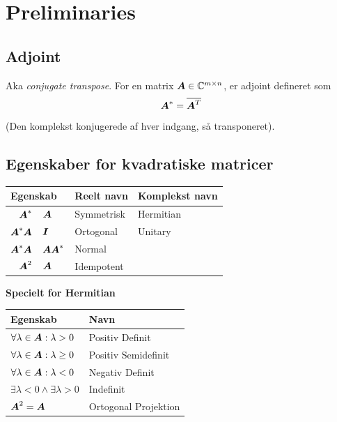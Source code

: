 \section{Preliminaries}

\subsection{Adjoint}

Aka \textit{conjugate transpose}. For en matrix $\boldsymbol{A} \in \mathbb{C}^{m \times n}$, er adjoint defineret som
\[
    \boldsymbol{A}^* = \overline{\boldsymbol{A}^T}
\]
(Den komplekst konjugerede af hver indgang, så transponeret).


\subsection{Egenskaber for kvadratiske matricer}


\begin{table}[h]
    \centering
    \renewcommand{\arraystretch}{1.5}

    \begin{tabular}{r@{$\;=\;$}l|l|l}
        \multicolumn{2}{l|}{Egenskab} & Reelt navn & Komplekst navn \\
        \hline
        $\boldsymbol{A}^*$ & $\boldsymbol{A} $ & Symmetrisk & Hermitian \\
        $\boldsymbol{A}^* \boldsymbol{A}$ & $\boldsymbol{I}$ & Ortogonal & Unitary \\
        $\boldsymbol{A}^* \boldsymbol{A}$ & $\boldsymbol{A} \boldsymbol{A}^*$ & \multicolumn{2}{l}{Normal} \\
        $\boldsymbol{A}^2$ & $\boldsymbol{A}$ & \multicolumn{2}{l}{Idempotent} \\
    \end{tabular}

    \vspace{2em}

    \textbf{Specielt for Hermitian}

    \begin{tabular}{l|l}
        Egenskab & Navn \\
        \hline
        $\forall \lambda \in \boldsymbol{A} : \lambda > 0$ & Positiv Definit \\
        $\forall \lambda \in \boldsymbol{A} : \lambda \ge 0$ & Positiv Semidefinit \\
        $\forall \lambda \in \boldsymbol{A} : \lambda < 0$ & Negativ Definit \\
        $\exists \lambda < 0 \land \exists \lambda > 0$ & Indefinit \\
        $\boldsymbol{A}^2 = \boldsymbol{A}$ & Ortogonal Projektion

    \end{tabular}
\end{table}

